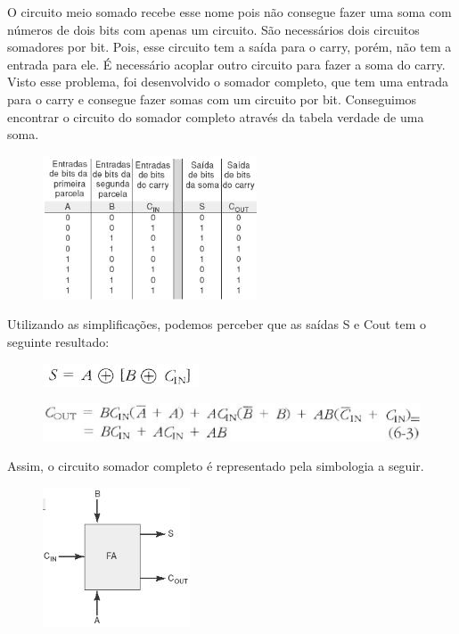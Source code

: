 \documentclass[12pts]{article}
\begin{document}
O circuito meio somado recebe esse nome pois não consegue fazer uma soma com números de dois bits com apenas um circuito. São necessários dois circuitos somadores por bit.  Pois, esse circuito tem a saída para o carry, porém, não tem a entrada para ele. É necessário acoplar outro circuito para fazer a soma do carry. Visto esse problema, foi desenvolvido o somador completo, que tem uma entrada para o carry e consegue fazer somas com um circuito por bit. Conseguimos encontrar o circuito do somador completo através da tabela verdade de uma soma.

\begin{figure}[!htb]
  \centering
  \includegraphics[scale=0.6	]{imagens/2}
  \label{figRotulo}
\end{figure}


Utilizando as simplificações, podemos perceber que as saídas S e Cout tem o seguinte resultado:

\begin{figure}[!htb]
  \centering
  \includegraphics[scale=0.6	]{imagens/3}
  \label{figRotulo}
\end{figure}

\begin{figure}[!htb]
  \centering
  \includegraphics[scale=0.6	]{imagens/4}
  \label{figRotulo}
\end{figure}

\newpage
Assim, o circuito somador completo é representado pela simbologia a seguir.

\begin{figure}[!htb]
  \centering
  \includegraphics[scale=0.6	]{imagens/5}
  \label{figRotulo}
\end{figure}
\end{document}
